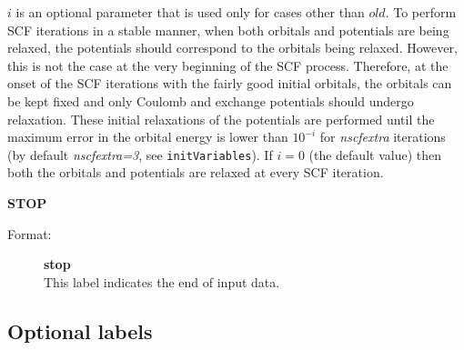 \documentclass[10pt,a4paper]{article}
\newcommand{\ft}[1]{\texttt{#1}}
\begin{document}
\begin{description}
\begin{description}
$i$ is an optional parameter that is used only for cases other than
$old$. To perform SCF iterations in a stable manner, when both orbitals and
potentials are being relaxed, the potentials should correspond to the
orbitals being relaxed. However, this is not the case at the very beginning
of the SCF process. Therefore, at the onset of the SCF iterations with the
fairly good initial orbitals, the orbitals can be kept fixed and only
Coulomb and exchange potentials should undergo relaxation. These initial
relaxations of the potentials are performed until the maximum error in the
orbital energy is lower than $10^{-i}$ for \textsl{nscfextra} iterations
(by default \textsl{nscfextra=3}, see \ft{initVariables}). If $i=0$ (the
default value) then both the orbitals and potentials are relaxed at every
SCF iteration.
\end{description}

\item \textbf{STOP}
\begin{description}
\item[Format:] \textbf{stop}\\
This label indicates the end of input data.
\end{description}

\end{description}

\subsection{Optional labels}
\end{document}
